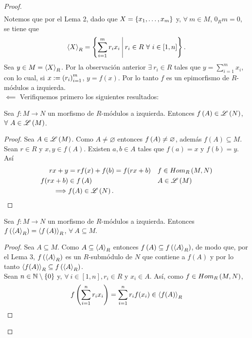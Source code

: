\documentclass{article}
\begin{document}
\begin{enumerate}[label=\textbf{Ej \arabic*.}]
\begin{proof}
\begin{align*}
			\end{align*}
			Notemos que por el Lema 2, dado que $X=\left\{x_1,\dotsc,x_m\right\}$ y, $\forall\ m\in M$, $0_Rm=0$, se tiene que
			\begin{equation*}
				\genmod{X}{R}=\lrbrack{\sum_{i=1}^mr_ix_i\ \vline\ r_i\in R\ \forall\ i\in[1,n]}.
			\end{equation*}
			Sea $y\in M=\left< X\right>_{R}$. Por la observación anterior $\exists\ r_i\in R$ tales que $y=\sum_{i=1}^{m}x_i$, con lo cual, si $x:={\left({r}_{i}\right)}_{i=1}^{m}$, $y=f(x)$. Por lo tanto $f$ es un epimorfismo de $R$-módulos a izquierda.\\
			$\boxed{\impliedby}$ Verifiquemos primero los siguientes resultados:
			\begin{lem}
				Sea $f:M\rightarrow N$ un morfismo de $R$-módulos a izquierda. Entonces $f\left(A\right)\in\mathscr{L}\left(N\right)$, $\forall\ A\in\mathscr{L}\left(M\right)$.
			\end{lem}
			\begin{proof}
				Sea $A\in \mathscr{L}\left(M\right)$. Como $A\neq\varnothing$ entonces $f\left(A\right)\neq\varnothing$, además $f(A)\subseteq M$. Sean $r\in R$ y $x,y\in f(A)$. Existen $a,b\in A$ tales que $f(a)=x$ y $f(b)=y$. Así
				\begin{align*}
					rx+y&=rf(x)+f(b)=f(rx+b) && f\in Hom_{R}\left(M,N\right)\\
					f(rx+b)&\in f\left(A\right) && A\in\mathscr{L}\left(M\right)\\
					\implies & f(A)\in\mathscr{L}\left(N\right).
				\end{align*}
			\end{proof}
			\begin{lem}
				Sea $f:M\rightarrow N$ un morfismo de $R$-módulos a izquierda. Entonces $f\left(\left< A\right>_{R}\right)=\left< f\left(A\right)\right>_{R}$, $\forall\ A\subseteq M$.
			\end{lem}
			\begin{proof}
				Sea $A\subseteq M$. Como $A\subseteq\left< A\right>_{R}$ entonces $f\left(A\right)\subseteq f\left(\left< A\right>_{R}\right)$, de modo que, por el Lema 3, $f\left(\left< A\right>_{R}\right)$ es un $R$-submódulo de $N$ que contiene a $f(A)$ y por lo tanto $\left< f(A)\right>_{R}\subseteq f\left(\left< A\right>_{R}\right)$.\\
				Sean $n\in\mathbb{N}\setminus\left\{0\right\}$ y, $\forall\ i\in[1,n], r_i\in R$ y $x_i\in A$. Así, como $f\in Hom_{R}\left(M,N\right)$,
				\begin{align*}
					f\lrprth{\sum_{i=1}^{n}r_ix_i}&=\sum_{i=1}^{n}r_i f(x_i)\in\genmod{f(A)}{R}\\

\end{align*}
\end{proof}
\end{proof}
\end{enumerate}
\end{document}
